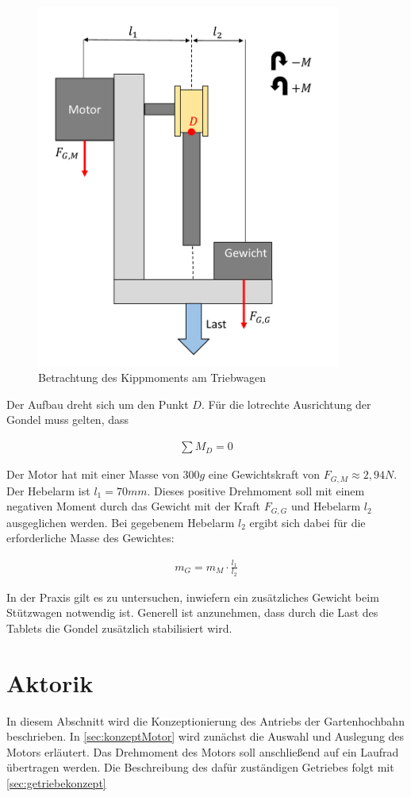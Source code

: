 \begin{figure}[h]
	\centering
	\includegraphics[width=10cm]{kippmoment.pdf} 
	\caption{Betrachtung des Kippmoments am Triebwagen}
	\label{pic:kippmoment}
\end{figure}
Der Aufbau dreht sich um den Punkt $D$. Für die lotrechte Ausrichtung der Gondel muss gelten, dass 

\begin{align}
	\sum M_D = 0
\end{align}
\newpage 

 Der Motor hat mit einer Masse von $300g$ eine Gewichtskraft von $F_{G,M} \approx 2,94N$. Der Hebelarm ist $l_1=70mm$. Dieses positive Drehmoment soll mit einem negativen Moment durch das Gewicht mit der Kraft $F_{G,G}$ und Hebelarm $l_2$ ausgeglichen werden. Bei gegebenem Hebelarm $l_2$ ergibt sich dabei für die erforderliche Masse des Gewichtes:

\begin{align}
	m_G = m_M \cdot \frac{l_1}{l_2}
\end{align}
 
In der Praxis gilt es zu untersuchen, inwiefern ein zusätzliches Gewicht beim Stützwagen notwendig ist. Generell ist anzunehmen, dass durch die Last des Tablets die Gondel zusätzlich stabilisiert wird.  

\section{Aktorik}
\label{sec:konzeptAktorik}
In diesem Abschnitt wird die Konzeptionierung des Antriebs der Gartenhochbahn beschrieben. In \autoref{sec:konzeptMotor} wird zunächst die Auswahl und Auslegung des Motors erläutert. Das Drehmoment des Motors soll anschließend auf ein Laufrad übertragen werden. Die Beschreibung des dafür zuständigen Getriebes folgt mit \autoref{sec:getriebekonzept}

